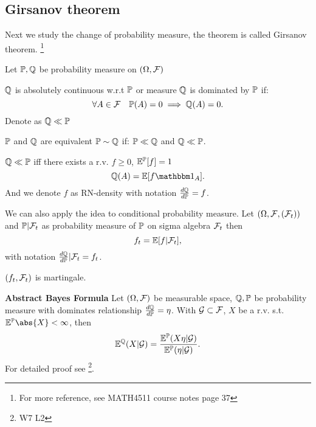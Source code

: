 \subsection{Girsanov theorem}
Next we study the change of probability measure, the theorem is called Girsanov theorem. \footnote{For more reference, see MATH4511 course notes page 37}

Let $\mathbb{P}, \mathbb{Q}$ be probability measure on $(\Omega, \mathcal{F})$ 
\begin{dfn}
    $\mathbb{Q}$ is absolutely continuous w.r.t $\mathbb{P}$ or measure $\mathbb{Q}$ is dominated by $\mathbb{P}$ if:
    \begin{equation*}
        \forall A\in\mathcal{F} \quad \mathbb{P}(A)=  0 \implies \mathbb{Q}(A) = 0.
    \end{equation*}
    Denote as $\mathbb{Q}\ll\mathbb{P}$
\end{dfn}
$\mathbb{P}$ and $\mathbb{Q}$ are equivalent $\mathbb{P} \sim \mathbb{Q}$ if: $\mathbb{P} \ll \mathbb{Q}$ and $\mathbb{Q} \ll \mathbb{P}$.

\begin{thm}

$\mathbb{Q}\ll\mathbb{P}$ iff there exists a r.v. $f\geq 0$, $\mathbb{E}^{\mathbb{P}}[f] = 1$
\begin{equation*}
    \Q(A) = \E[f\I{A}].
\end{equation*}
And we denote $f$ as RN-density with notation $\frac{\mathop{}\!d \mathbb{Q}}{\mathop{}\!d \mathbb{P}} = f$.
\end{thm}

We can also apply the idea to conditional probability measure. Let $(\Omega, \mathcal{F}, (\mathcal{F}_t))$ and $\mathbb{P}|\mathcal{F}_t$ as probability measure of $\mathbb{P}$ on sigma algebra $\mathcal{F}_t$ then 
\begin{equation*}
    f_t = \mathbb{E}[f|\mathcal{F}_t],
\end{equation*} with notation $\frac{\mathop{}\!d \mathbb{Q}}{\mathop{}\!d \mathbb{P}}|\mathcal{F}_t = f_t$.

\begin{cor}
$(f_t, \mathcal{F}_t)$ is martingale.
\end{cor}

\vspace{2cm}

\textbf{Abstract Bayes Formula}
Let $(\Omega, \mathcal{F})$ be measurable space, $\mathbb{Q}, \mathbb{P}$ be probability measure with dominates relationship $\frac{\mathop{}\!d \mathbb{Q}}{\mathop{}\!d \mathbb{P}} = \eta$. With $\mathcal{G} \subset \mathcal{F}$, $X$ be a r.v. s.t. $\E^\prob \abs{X} < \infty$, then
\begin{equation*}
    \mathbb{E}^{\mathbb{Q}}(X|\mathcal{G}) = \frac{\mathbb{E}^{\mathbb{P}} (X\eta |\mathcal{G})}{\mathbb{E}^{\mathbb{P}} (\eta|\mathcal{G})}.
\end{equation*}
\pf For detailed proof see \footnote{W7 L2}.

